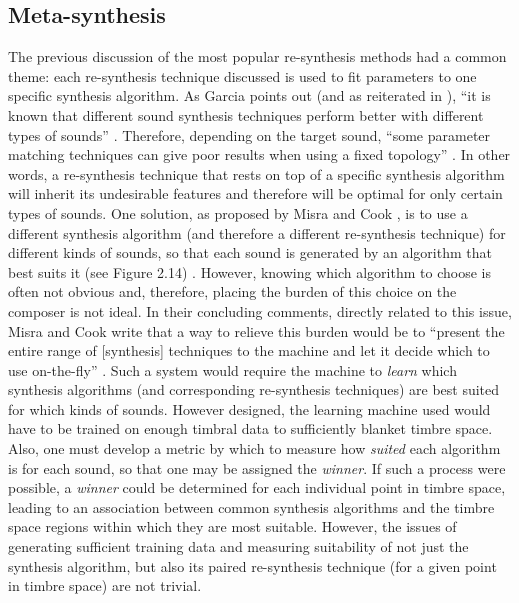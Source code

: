\documentclass[a4paper,12pt]{report} 	%
\numberwithin{figure}{chapter}
\numberwithin{table}{chapter}
\numberwithin{equation}{chapter}
\begin{document}
\begin{flushleft}
\section{Meta-synthesis}

The previous discussion of the most popular re-synthesis methods had a common theme: each re-synthesis technique discussed is used to fit parameters to one specific synthesis algorithm. As Garcia points out (and as reiterated in \cite[p. 103]{Tolonen:1998bh}), ``it is known that different sound synthesis techniques perform better with different types of sounds'' \cite[p. 1]{Garcia:2001jw}. Therefore, depending on the target sound, ``some parameter matching techniques can give poor results when using a fixed topology'' \cite[p. 1]{Garcia:2000th}. In other words, a re-synthesis technique that rests on top of a specific synthesis algorithm will inherit its undesirable features and therefore will be optimal for only certain types of sounds. One solution, as proposed by Misra and Cook \cite{Misra:2009km}, is to use a different synthesis algorithm (and therefore a different re-synthesis technique) for different kinds of sounds, so that each sound is generated by an algorithm that best suits it (see Figure 2.14) \cite[p. 1]{Misra:2009km}. However, knowing which algorithm to choose is often not obvious and, therefore, placing the burden of this choice on the composer is not ideal. In their concluding comments, directly related to this issue, Misra and Cook write that a way to relieve this burden would be to ``present the entire range of [synthesis] techniques to the machine and let it decide which to use on-the-fly''  \cite[p. 5]{Misra:2009km}. Such a system would require the machine to \emph{learn} which synthesis algorithms (and corresponding re-synthesis techniques) are best suited for which kinds of sounds. However designed, the learning machine used would have to be trained on enough timbral data to sufficiently blanket timbre space. Also, one must develop a metric by which to measure how \emph{suited} each algorithm is for each sound, so that one may be assigned the \emph{winner}. If such a process were possible, a \emph{winner} could be determined for each individual point in timbre space, leading to an association between common synthesis algorithms and the timbre space regions within which they are most suitable. However, the issues of generating sufficient training data and measuring suitability of not just the synthesis algorithm, but also its paired re-synthesis technique (for a given point in timbre space) are not trivial.
\\

\end{flushleft}
\end{document}
